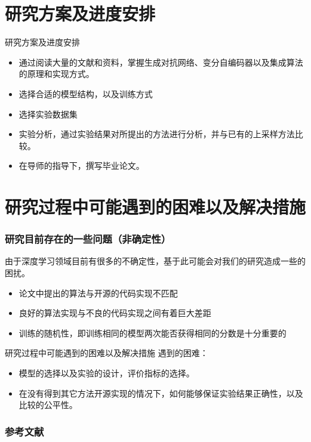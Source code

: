 \documentclass{beamer}
\begin{document}
\section{研究方案及进度安排}
\begin{frame}{研究方案及进度安排}\pause
    \begin{itemize}
        \item 
        通过阅读大量的文献和资料，掌握生成对抗网络、变分自编码器以及集成算法的原理和实现方式。
        \item 
        选择合适的模型结构，以及训练方式
        \item 
        选择实验数据集
        \item 
        实验分析，通过实验结果对所提出的方法进行分析，并与已有的上采样方法比较。
        \item 
        在导师的指导下，撰写毕业论文。
    \end{itemize}
\end{frame}

\section{研究过程中可能遇到的困难以及解决措施}

\begin{frame}[c]\frametitle{研究目前存在的一些问题（非确定性）}
    由于深度学习领域目前有很多的不确定性，基于此可能会对我们的研究造成一些的困扰。
    \begin{itemize}
        \item 论文中提出的算法与开源的代码实现不匹配
        \item 良好的算法实现与不良的代码实现之间有着巨大差距
        \item 训练的随机性，即训练相同的模型两次能否获得相同的分数是十分重要的
    \end{itemize}
\end{frame}

\begin{frame}{研究过程中可能遇到的困难以及解决措施}\pause
    遇到的困难：
    \begin{itemize}
       \item 
       模型的选择以及实验的设计，评价指标的选择。
       \item 
       在没有得到其它方法开源实现的情况下，如何能够保证实验结果正确性，以及比较的公平性。
    \end{itemize}
\end{frame}

\begin{frame}[allowframebreaks]\frametitle{参考文献}
    \scriptsize
    
    
\end{frame}
\end{document}

